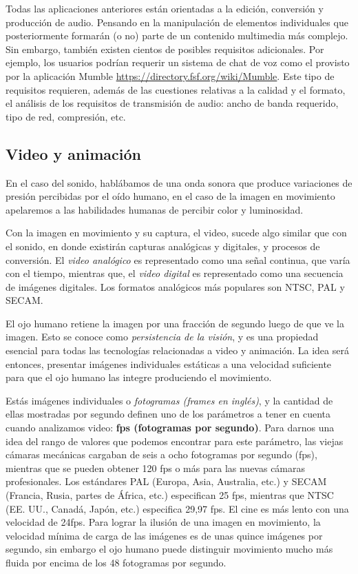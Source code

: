 \documentclass[12pt]{article}
\begin{document}
Todas las aplicaciones anteriores están orientadas a la edición, conversión 
y producción de audio. Pensando en la manipulación de elementos individuales
que posteriormente formarán (o no) parte de un contenido multimedia más 
complejo. Sin embargo, también existen cientos de posibles requisitos adicionales.
Por ejemplo, los usuarios podrían requerir un sistema de chat de voz como 
el provisto por la aplicación Mumble \url{https://directory.fsf.org/wiki/Mumble}. 
Este tipo de requisitos requieren, además de las cuestiones relativas a la calidad
y el formato, el análisis de los requisitos de transmisión de audio: ancho de banda 
requerido, tipo de red, compresión, etc. 


\subsection*{Video y animación}

En el caso del sonido, hablábamos de una onda sonora
que produce variaciones de presión percibidas por el oído humano, en el caso 
de la imagen en movimiento apelaremos a las habilidades humanas de 
percibir color y luminosidad.  

Con la imagen en movimiento y su captura, el video, sucede algo similar que con 
el sonido, en donde existirán capturas analógicas y digitales, y procesos 
de conversión. El {\it video analógico} es representado como una señal continua, que varía con 
el tiempo, mientras que, el {\it video digital} es representado como una secuencia 
de imágenes digitales. Los formatos analógicos más populares son NTSC, PAL y SECAM.  

El ojo humano retiene la imagen por una fracción de segundo luego de 
que ve la imagen. Esto se conoce como {\it persistencia de la visión}, y es 
una propiedad esencial para todas las tecnologías relacionadas a video y 
animación. La idea será entonces, presentar imágenes individuales estáticas
a una velocidad suficiente para que el ojo humano las integre produciendo 
el movimiento. 

Estás imágenes individuales o {\it fotogramas (frames en inglés)}, y la 
cantidad de ellas mostradas por segundo definen uno de los parámetros a 
tener en cuenta cuando analizamos video: {\bf fps (fotogramas por segundo)}. 
Para darnos una idea del rango de valores que podemos encontrar para 
este parámetro, las viejas cámaras mecánicas cargaban de seis a ocho 
fotogramas por segundo (fps), mientras que se pueden obtener 120 fps o más para 
las nuevas cámaras profesionales. Los estándares PAL (Europa, Asia, Australia, 
etc.) y SECAM (Francia, Rusia, partes de África, etc.) especifican 25 fps, 
mientras que NTSC (EE. UU., Canadá, Japón, etc.) especifica 29,97 fps. El cine 
es más lento con una velocidad de 24fps. Para lograr la ilusión de una 
imagen en movimiento, la velocidad mínima de carga de las imágenes es de unas 
quince imágenes por segundo, sin embargo el ojo humano puede distinguir 
movimiento mucho más fluida por encima de los 48 fotogramas por segundo.
\end{document}
